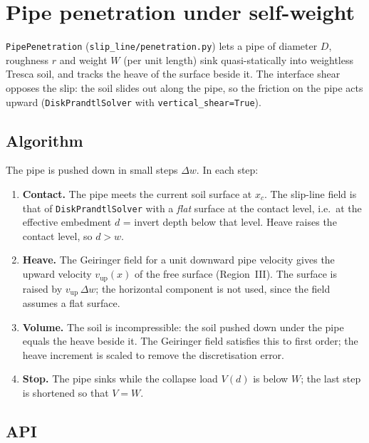 \documentclass[11pt,a4paper]{article}
\begin{document}
\section{Pipe penetration under self-weight}
\label{sec:penetration}

\texttt{PipePenetration} (\texttt{slip\_line/penetration.py}) lets a
pipe of diameter $D$, roughness $r$ and weight $W$ (per unit length)
sink quasi-statically into weightless Tresca soil, and tracks the heave
of the surface beside it.  The interface shear opposes the slip: the
soil slides out along the pipe, so the friction on the pipe acts upward
(\texttt{DiskPrandtlSolver} with \texttt{vertical\_shear=True}).

\subsection{Algorithm}

The pipe is pushed down in small steps $\Delta w$.  In each step:
\begin{enumerate}
  \item \textbf{Contact.}  The pipe meets the current soil surface at
        $x_c$.  The slip-line field is that of \texttt{DiskPrandtlSolver}
        with a \emph{flat} surface at the contact level, i.e.\ at the
        effective embedment $d$ = invert depth below that level.  Heave
        raises the contact level, so $d > w$.
  \item \textbf{Heave.}  The Geiringer field for a unit downward pipe
        velocity gives the upward velocity $v_\text{up}(x)$ of the free
        surface (Region~III).  The surface is raised by
        $v_\text{up}\,\Delta w$; the horizontal component is not used,
        since the field assumes a flat surface.
  \item \textbf{Volume.}  The soil is incompressible: the soil pushed
        down under the pipe equals the heave beside it.  The Geiringer
        field satisfies this to first order; the heave increment is
        scaled to remove the discretisation error.
  \item \textbf{Stop.}  The pipe sinks while the collapse load $V(d)$ is
        below $W$; the last step is shortened so that $V = W$.
\end{enumerate}

\subsection{API}
\end{document}
